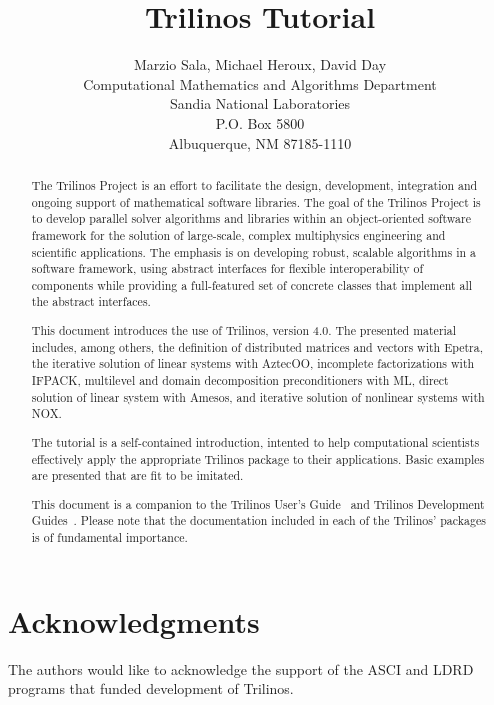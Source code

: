 \documentclass[12pt,relax]{SANDreport}
\author{Marzio Sala, Michael Heroux, David Day \\
Computational Mathematics and Algorithms Department \\
Sandia National Laboratories \\
P.O. Box 5800 \\
Albuquerque, NM 87185-1110
}
\title{Trilinos Tutorial}
\newcommand{\Trilinos}{Trilinos}
\begin{document}
\maketitle

\begin{abstract}
  
  The Trilinos Project is an effort to facilitate the design,
  development, integration and ongoing support of mathematical software
  libraries.  The goal of the Trilinos Project is to develop parallel
  solver algorithms and libraries within an object-oriented software
  framework for the solution of large-scale, complex multiphysics
  engineering and scientific applications. The emphasis is on developing
  robust, scalable algorithms in a software framework, using abstract
  interfaces for flexible interoperability of components while providing
  a full-featured set of concrete classes that implement all the
  abstract interfaces.

  \medskip
  
  This document introduces the use of \Trilinos{}, version 4.0.  The
  presented material includes, among others, the definition of
  distributed matrices and vectors with Epetra, the iterative solution
  of linear systems with AztecOO, incomplete factorizations with IFPACK,
  multilevel and domain decomposition preconditioners with ML, direct
  solution of linear system with Amesos,
  and iterative solution of nonlinear systems with NOX.
  
  The tutorial is a self-contained introduction, intented to help
  computational scientists effectively apply the appropriate Trilinos
  package to their applications. Basic examples are presented that are
  fit to be imitated.

  \medskip
  
  This document is a companion to the Trilinos User's
  Guide~\cite{Trilinos-Users-Guide} and Trilinos Development
  Guides~\cite{Trilinos-Dev-Guide,Trilinos-Dev-Guide-II}. Please note
  that the documentation included in each of the Trilinos' packages is
  of fundamental importance.
 
\end{abstract}

\clearpage
\section*{Acknowledgments}
The authors would like to acknowledge the support of the ASCI and LDRD programs
that funded development of Trilinos.
\end{document}
